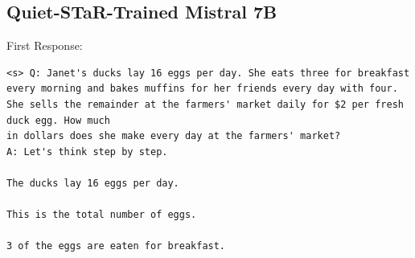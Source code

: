 \documentclass{article} %
\begin{document}
\subsection{Quiet-STaR-Trained Mistral 7B}

First Response:
\begin{lstlisting}
<s> Q: Janet's ducks lay 16 eggs per day. She eats three for breakfast every morning and bakes muffins for her friends every day with four. She sells the remainder at the farmers' market daily for $2 per fresh duck egg. How much 
in dollars does she make every day at the farmers' market?                                                                                                                                                                           
A: Let's think step by step.                                                                                                                                                                                                         
                                                                                                                                                                                                                                     
The ducks lay 16 eggs per day.                                                                                                                                                                                                       
                                                                                                                                                                                                                                     
This is the total number of eggs.                                                                                                                                                                                                    
                                                                                                                                                                                                                                     
3 of the eggs are eaten for breakfast.                                                                                                                                                                                               
                                                                                                                                                                                                                                     

\end{lstlisting}
\end{document}
